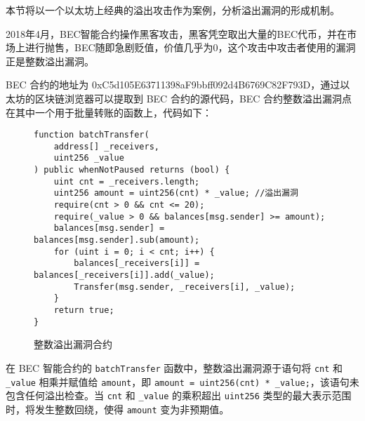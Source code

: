 \documentclass[print, master, vlined, timesmath]{DissertUESTC}
\begin{document}
本节将以一个以太坊上经典的溢出攻击作为案例，分析溢出漏洞的形成机制。

2018年4月，BEC智能合约操作黑客攻击，黑客凭空取出大量的BEC代币，并在市场上进行抛售，BEC随即急剧贬值，价值几乎为0，这个攻击中攻击者使用的漏洞正是整数溢出漏洞。

BEC 合约的地址为 0xC5d105E63711398aF9bbff092d4B6769C82F793D，通过以太坊的区块链浏览器可以提取到 BEC 合约的源代码，BEC 合约整数溢出漏洞点在其中一个用于批量转账的函数上，代码如下：

\begin{figure}[H]
    \centering
    \begin{minipage}{0.9\textwidth}
    \begin{verbatim}
function batchTransfer(
    address[] _receivers, 
    uint256 _value
) public whenNotPaused returns (bool) {
    uint cnt = _receivers.length;
    uint256 amount = uint256(cnt) * _value; //溢出漏洞
    require(cnt > 0 && cnt <= 20);
    require(_value > 0 && balances[msg.sender] >= amount);
    balances[msg.sender] = balances[msg.sender].sub(amount);
    for (uint i = 0; i < cnt; i++) {
        balances[_receivers[i]] = balances[_receivers[i]].add(_value);
        Transfer(msg.sender, _receivers[i], _value);
    }
    return true;
}
    \end{verbatim}
    \end{minipage}
    \caption{整数溢出漏洞合约}
\end{figure}





在 BEC 智能合约的 \texttt{batchTransfer} 函数中，整数溢出漏洞源于语句将 \texttt{cnt} 和 \texttt{\_value} 相乘并赋值给 \texttt{amount}，即 \texttt{amount = uint256(cnt) * \_value;}，该语句未包含任何溢出检查。当 \texttt{cnt} 和 \texttt{\_value} 的乘积超出 \texttt{uint256} 类型的最大表示范围时，将发生整数回绕，使得 \texttt{amount} 变为非预期值。
\end{document}
